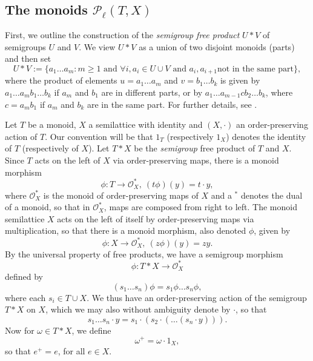 \documentclass[12pt]{amsart}
\theoremstyle{definition}
\theoremstyle{definition}
\numberwithin{them}{section}
\numberwithin{equation}{section}
\begin{document}
{{\subsection{The monoids $\mathcal{P}_{\ell}(T,X)$ }\label{sub:PTX}
 First, we outline the construction of the  {\em semigroup free product}  $U\ast  V$ of semigroups $U$ and $V$. We view   $U\ast V$  as a union of two  disjoint monoids (parts) and then set 
$$U\ast V:= \{ a_1 \dots a_m: m \geq 1 \mbox{ and } \forall i,  a_i \in U\cup V  \mbox{ and }  a_i, a_{i+1} \mbox{not in the same part} \},$$
where the product of elements $u=a_1 \dots a_m$ and $v=b_1 \dots b_k$ is given  by \, $a_1 \dots a_mb_1 \dots b_k$ if $a_m$ and $b_1$ are in different parts, or by $a_1 \dots a_{m-1}cb_2 \dots b_k$, where $c=a_mb_1$ if $a_m$ and $b_k$ are in the same part. For further details, see \cite[Chapter 8]{H}.

 Let $T$ be a monoid,   
 $X$  a semilattice with identity
and  $(X,\cdot)$  an order-preserving action of $T$. Our convention will be that $1_T$ (respectively $1_X$) denotes the identity of $T$ (respectively of $X$).   
Let $T * X$ be the  {\em semigroup} free product of $T$ and $X$. Since $T$ acts on the left of $X$ via order-preserving maps, there is a monoid morphism
\[\phi: T \rightarrow {\mathcal{O}}^{\ast}_X, \ (t\phi)(y) = t \cdot y,\]
where ${\mathcal{O}}^{\ast}_X$ is the monoid of order-preserving maps of $X$ and a $ ^{\ast} $ denotes the dual of a monoid, so that in ${\mathcal{O}}^{\ast}_X$, maps are composed from right to left. The monoid semilattice $X$ acts on the left of itself by order-preserving maps via multiplication, so that there is a monoid morphism, also denoted $\phi$, given by
\[\phi: X \rightarrow {\mathcal{O}}^{\ast}_X,\ (z\phi)(y) = zy.\]
By the universal property of free products, we have a semigroup morphism
\[\phi: T * X \rightarrow {\mathcal{O}}^{\ast}_X\]
defined by
\[(s_1\dots s_n)\phi = s_1\phi \dots s_n\phi,\]
where each $s_i \in T \cup X$. We thus have  an order-preserving  action of the semigroup $T * X$ on $X$, which we may also without ambiguity denote by $\cdot$, so that
\[s_1\dots s_n \cdot y = s_1 \cdot (s_2 \cdot (\dots (s_n \cdot y))).\]
 Now for $\omega \in T * X$, we define
\[\omega^{+} = \omega \cdot 1_X,\]
so that $e^{+} = e$, for all $e \in X$.

}}
\end{document}
